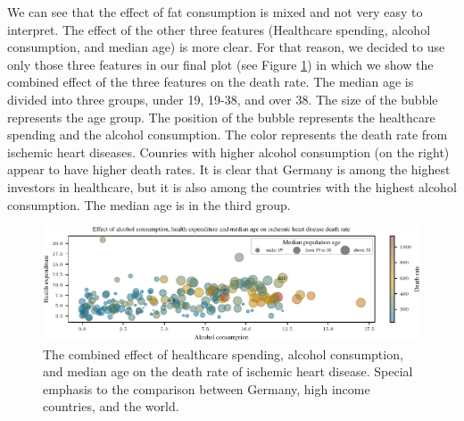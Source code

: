 We can see that the effect of fat consumption is mixed and not very easy to interpret. The effect of the other three features 
(Healthcare spending, alcohol consumption, and median age) is more clear. For that reason, we decided to use only those three features in our final plot 
(see Figure \ref{bubble_plot_factors}) in which we show the combined effect of the three features on the death rate. The median age is divided into three 
groups, under 19, 19-38, and over 38. The size of the bubble represents the age group. The position of the bubble represents the healthcare spending and
the alcohol consumption. The color represents the death rate from ischemic heart diseases. 
Counries with higher alcohol consumption (on the right) appear to have higher death rates.
It is clear that Germany is among the highest investors in healthcare, but it is also among the countries with the highest alcohol consumption. The median age
is in the third group.


\begin{figure}[ht]
    \vskip 0.2in
    \centering
    \centerline{\includegraphics[]{fig/fig_bubble_plot_factors.pdf}}
    \caption{The combined effect of healthcare spending, alcohol consumption, and median age on the death rate of ischemic heart disease. Special 
        emphasis to the comparison between Germany, high income countries, and the world.}
    \label{bubble_plot_factors}
\end{figure}